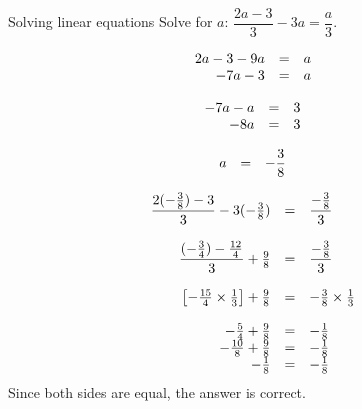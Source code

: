 \begin{wex}
{Solving linear equations}
{Solve for $a$: $\dfrac{2a-3}{3}-3a=\dfrac{a}{3}$.}
{

\begin{equation*}
    \begin{array}{cccc}\hfill 2a-3 - 9a &= &a\hfill & \\ 
\hfill -7a - 3 &= &a\hfill & 
    \end{array}
\end{equation*}

\begin{equation*}
    \begin{array}{cccc}\hfill -7a -a &= &3\hfill & \\ 
\hfill -8a &= &3\hfill & \\
    \end{array}
\end{equation*}

\begin{equation*}
    \begin{array}{cccc}\hfill a &= & -\dfrac{3}{8}\hfill & \\ 

    \end{array}
\end{equation*}

\begin{equation*}
    \begin{array}{ccll}\hfill \dfrac{2(-\frac{3}{8}) - 3}{3} - 3(-\frac{3}{8}) &= & \dfrac{-\frac{3}{8}}{3}\hfill & \\ 
\\
      \hfill \dfrac{(-\frac{3}{4}) - \frac{12}{4}}{3} + \frac{9}{8} &= & \dfrac{-\frac{3}{8}}{3}\hfill & \\ 
\\
 \hfill \left[-\frac{15}{4} \times \frac{1}{3}\right] + \frac{9}{8} &= & -\frac{3}{8} \times \frac{1}{3}\hfill & \\ 
\\
 \hfill -\frac{5}{4} + \frac{9}{8} &= & -\frac{1}{8}\hfill & \\ 
 \hfill -\frac{10}{8} + \frac{9}{8} &= & -\frac{1}{8}\hfill & \\ 
 \hfill -\frac{1}{8} &= & -\frac{1}{8}\hfill & 
    \end{array}
\end{equation*}
Since both sides are equal, the answer is correct. 
}
\end{wex}

